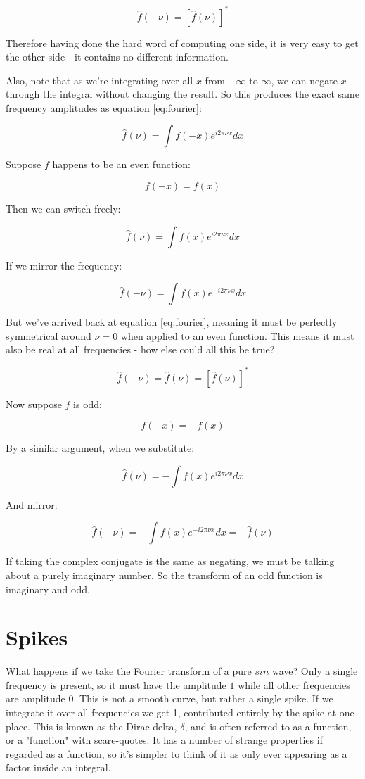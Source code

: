 $$
\hat{f}(-\nu) = \left[ \hat{f}(\nu) \right]^*
$$

Therefore having done the hard word of computing one side, it is very easy to get the other side - it contains no different information.

Also, note that as we're integrating over all $x$ from $-\infty$ to $\infty$, we can negate $x$ through the integral without changing the result. So this produces the exact same frequency amplitudes as equation \eqref{eq:fourier}:

$$\hat{f}(\nu) = \int f(-x)e^{i2\pi\nu x} dx$$

Suppose $f$ happens to be an even function:

$$f(-x) = f(x)$$

Then we can switch freely:

$$\hat{f}(\nu) = \int f(x)e^{i2\pi\nu x} dx$$

If we mirror the frequency:

$$\hat{f}(-\nu) = \int f(x)e^{-i2\pi\nu x} dx$$

But we've arrived back at equation \eqref{eq:fourier}, meaning it must be perfectly symmetrical around $\nu = 0$ when applied to an even function. This means it must also be real at all frequencies - how else could all this be true?

$$
\hat{f}(-\nu) = \hat{f}(\nu) = \left[ \hat{f}(\nu) \right]^*
$$

Now suppose $f$ is odd:

$$f(-x) = -f(x)$$

By a similar argument, when we substitute:

$$
\hat{f}(\nu) = - \int f(x)e^{i2\pi\nu x}
dx
$$

And mirror:

$$
\hat{f}(-\nu) = - \int f(x)e^{-i2\pi\nu x}
dx
= -\hat{f}(\nu)
$$

If taking the complex conjugate is the same as negating, we must be talking about a purely imaginary number. So the transform of an odd function is imaginary and odd.

\section{Spikes} \label{sec:fourier-spike}

What happens if we take the Fourier transform of a pure $sin$ wave? Only a single frequency is present, so it must have the amplitude $1$ while all other frequencies are amplitude $0$. This is not a smooth curve, but rather a single spike. If we integrate it over all frequencies we get 1, contributed entirely by the spike at one place. This is known as the Dirac delta, $\delta$, and is often referred to as a function, or a "function" with scare-quotes. It has a number of strange properties if regarded as a function, so it's simpler to think of it as only ever appearing as a factor inside an integral.


